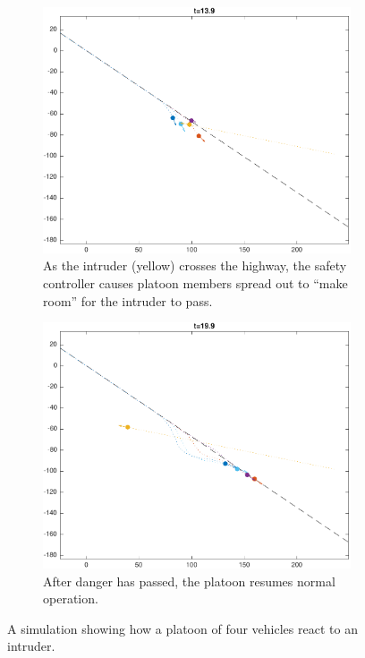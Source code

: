 \begin{figure}
    \begin{subfigure}[t]{0.23\textwidth} \label{subfig:in_140}
        \includegraphics[width=\textwidth]{fig/in_140}
        \caption{As the intruder (yellow) crosses the highway, the safety controller causes platoon members spread out to ``make room'' for the intruder to pass.}
    \end{subfigure}
    \begin{subfigure}[t]{0.23\textwidth} \label{subfig:in_200}
        \includegraphics[width=\textwidth]{fig/in_200}
        \caption{After danger has passed, the platoon resumes normal operation.}
    \end{subfigure}   
    \caption{A simulation showing how a platoon of four vehicles react to an intruder. \label{fig:in}}
\end{figure}

